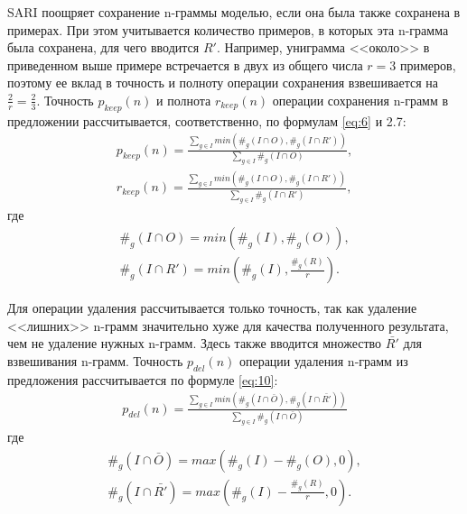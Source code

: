 SARI поощряет сохранение n-граммы моделью, если она была также сохранена в примерах. При этом учитывается количество примеров, в которых эта n-грамма была сохранена, для чего вводится $R'$. Например, униграмма <<около>> в приведенном выше примере встречается в двух из общего числа $r=3$ примеров, поэтому ее вклад в точность и полноту операции сохранения взвешивается на $\frac{2}{r}=\frac{2}{3}$. Точность $p_{keep}(n)$ и полнота $r_{keep}(n)$ операции сохранения n-грамм в предложении  рассчитывается, соответственно, по формулам \ref{eq:6} и 2.7: 
\begin{eqnarray} 
	\label{eq:6}
	p_{keep}(n) = \frac{\sum\limits_{g\in{I}}^{} min\left( \#_{g}\left(I\cap{O}\right), \#_{g}\left(I\cap{R'}\right)\right)}{\sum\limits_{g\in{I}}^{} \#_{g}\left(I\cap{O}\right)} ,\\
	r_{keep}(n) = \frac{\sum\limits_{g\in{I}}^{} min\left( \#_{g}\left(I\cap{O}\right), \#_{g}\left(I\cap{R'}\right)\right)}{\sum\limits_{g\in{I}}^{} \#_{g}\left(I\cap{R'}\right)} ,
\end{eqnarray}
где 
\begin{eqnarray} 
	\label{eq:8}
	\#_{g}\left(I\cap{O}\right) = min\left(\#_{g}\left(I\right), \#_{g}\left(O\right)\right) ,\\
	\#_{g}\left(I\cap{R'}\right) = min\left(\#_{g}\left(I\right), \frac{\#_{g}\left(R\right)}{r}\right) .
\end{eqnarray}

Для операции удаления рассчитывается только точность, так как удаление <<лишних>> n-грамм значительно хуже для качества полученного результата, чем не удаление нужных n-грамм. Здесь также вводится множество $\bar{R'}$ для взвешивания n-грамм. Точность $p_{del}(n)$ операции удаления n-грамм из предложения рассчитывается по формуле \ref{eq:10}:
\begin{eqnarray} 
	\label{eq:10}
	p_{del}(n) = \frac{\sum\limits_{g\in{I}}^{} min\left( \#_{g}\left(I\cap{\bar{O}}\right), \#_{g}\left(I\cap{\bar{R'}}\right)\right)}{\sum\limits_{g\in{I}}^{} \#_{g}\left(I\cap{\bar{O}}\right)}
\end{eqnarray}
где 
\begin{eqnarray} 
	\label{eq:11}
	\#_{g}\left(I\cap{\bar{O}}\right) = max\left(\#_{g}\left(I\right) - \#_{g}\left(O\right), 0\right) ,\\
	\#_{g}\left(I\cap{\bar{R'}}\right) = max\left(\#_{g}\left(I\right) - \frac{\#_{g}\left(R\right)}{r}, 0\right) .
\end{eqnarray}

